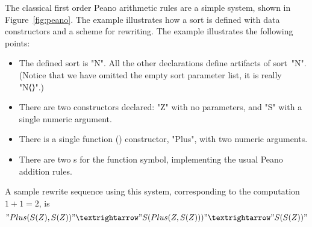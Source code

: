 \documentclass[letterpaper,11pt]{article}
\newcommand{\CK}[1]{\textcolor{blue}{CK: #1}}
\newcommand{\KR}[1]{\textcolor{red}{KR: #1}}
\newcommand{\MS}[1]{\textcolor{violet}{MS: #1}}
\begin{document}
\begin{example}[Peano]\label{ex:peano}
  The classical first order Peano arithmetic rules are a simple \hax system, shown in
  Figure~\ref{fig:peano}.  The example illustrates how a sort is defined with data constructors and
  a scheme for rewriting. The example illustrates the following points:
  \begin{itemize}

  \item The defined sort is "N". All the other declarations define artifacts of sort~"N". (Notice
    that we have omitted the empty sort parameter list, it is really "N⟨⟩".)

  \item There are two  constructors declared: "Z" with no parameters, and "S" with a single numeric
    argument.

  \item There is a single function () constructor, "Plus", with two numeric arguments.

  \item There are two s for the function symbol, implementing the usual Peano addition rules.

  \end{itemize}
  A sample rewrite sequence using this system, corresponding to the computation $1+1=2$, is
  \begin{displaymath}
    "Plus(S(Z), S(Z))" →
    "S(Plus(Z, S(Z)))" →
    "S(S(Z))"
  \end{displaymath}
\end{example}

\end{document}
